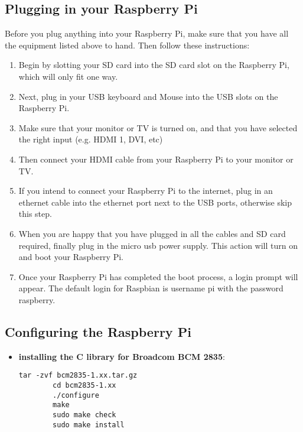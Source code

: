\documentclass[
10pt, %
a4paper, %
oneside, %
headinclude,footinclude, %
BCOR5mm, %
]{scrartcl}
\begin{document}
\subsection{Plugging in your Raspberry Pi}
Before you plug anything into your Raspberry Pi, make sure that you have all the equipment listed above to hand. Then follow these instructions: \\
\begin{enumerate}
	\item Begin by slotting your SD card into the SD card slot on the Raspberry Pi, which will only fit one way.
	\item Next, plug in your USB keyboard and Mouse into the USB slots on the Raspberry Pi.
	\item Make sure that your monitor or TV is turned on, and that you have selected the right input (e.g. HDMI 1, DVI, etc)\\
	\item Then connect your HDMI cable from your Raspberry Pi to your monitor or TV.
	\item If you intend to connect your Raspberry Pi to the internet, plug in an ethernet cable into the ethernet port next to the USB ports, otherwise skip this step.
	\item When you are happy that you have plugged in all the cables and SD card required, finally plug in the micro usb power supply. This action will turn on and boot your Raspberry Pi.
	\item Once your Raspberry Pi has completed the boot process, a login prompt will appear. The default login for Raspbian is username pi with the password raspberry.
\end{enumerate}

\subsection{Configuring the Raspberry Pi}

\begin{itemize}
\item \textbf{installing the C library for Broadcom BCM 2835}:\\
	\begin{lstlisting}[style= BashInputStyle]
		tar -zvf bcm2835-1.xx.tar.gz 
		cd bcm2835-1.xx 
		./configure
		make
		sudo make check
		sudo make install
	\end{lstlisting}
\end{itemize} 

%

\end{document}
